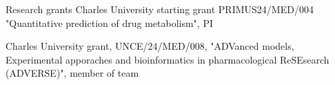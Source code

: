 \begin{rubric}{Research grants}
%
\entry*[2024 - 2027]%
  Charles University starting grant PRIMUS24/MED/004 "Quantitative prediction of drug metabolism", PI

\entry*[2024 - 2029]%
  Charles University grant, UNCE/24/MED/008, "ADVanced models, Experimental apporaches and bioinformatics in pharmacological ReSEsearch (ADVERSE)", member of team
\end{rubric}
